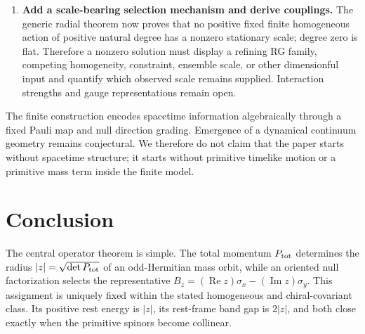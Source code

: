 \documentclass[11pt]{article}
\newcommand{\Kernel}{\textcolor{kernelcolor}{\textsc{Kernel}}}
\newcommand{\NewResult}{\textsc{New}}
\begin{document}
\begin{enumerate}[leftmargin=2em]
  This is a Fock-level result, not merely a chosen $2\times2$ model.  The
  pair-block Fock operators are linearly equivalent to $M_2(\mathbb C)$ with
  Hermiticity preserved, and the block gauge is the shadow of an explicit Fock
  unitary (\texttt{CARBlockReduction}).  Moreover, the allowed chiral action is
  forced by the complete covariance group of the static family $\{B_z\}$,
  which is the chiral phase circle plus an orientation-flip coset
  (\texttt{MassCovarianceForcing}, \texttt{CovarianceGroupFull}).  The remaining
  generator-level result gives the covariance of
  $H(k,z)=k\Gamma+B_z$ is exactly the diagonal chiral-phase circle at fixed
  momentum, while the antidiagonal coset survives only together with parity
  $k\mapsto-k$.  These same two branches now act exactly on the ordered
  two-channel finite step $U(k,z)=T(k)C(z)$: the diagonal branch sends
  $z\mapsto uz$ at fixed momentum, while the antidiagonal branch sends
  $(k,z)\mapsto(-k,u\bar z)$.  This is \NewResult{} \Kernel{}
  (\texttt{DiscreteWalkMassCovariance}).  Exhaustion of every covariance of
  that discrete step, and its extension to the full ordered $3+1$ regulator,
  remain open.  A covariance transforms the field parameter; it is not
  literally a commutant.
  \item \textbf{Add a scale-bearing selection mechanism and derive couplings.}
  The generic radial theorem now proves that no positive fixed finite
  homogeneous action of positive natural degree has a nonzero stationary
  scale; degree zero is flat.  Therefore a nonzero solution must display a
  refining RG family, competing homogeneity, constraint, ensemble scale, or
  other dimensionful input and quantify which observed scale remains supplied.
  Interaction strengths and gauge representations remain open.
\end{enumerate}
\fi

The finite construction encodes spacetime information algebraically through a
fixed Pauli map and null direction grading.  Emergence of a dynamical continuum
geometry remains conjectural.  We therefore do not claim that the paper starts
without spacetime structure; it starts without primitive timelike motion or a
primitive mass term inside the finite model.

\section{Conclusion}

The central operator theorem is simple.  The total momentum
$P_{\rm tot}$ determines the radius
$|z|=\sqrt{\det P_{\rm tot}}$ of an odd-Hermitian mass orbit, while an oriented
null factorization selects the representative
$B_z=(\operatorname{Re}z)\sigma_x-(\operatorname{Im}z)\sigma_y$.  This
assignment is uniquely fixed within the stated homogeneous and chiral-covariant
class.  Its positive rest energy is $|z|$, its rest-frame band gap is $2|z|$,
and both close exactly when the primitive spinors become collinear.
\end{document}
